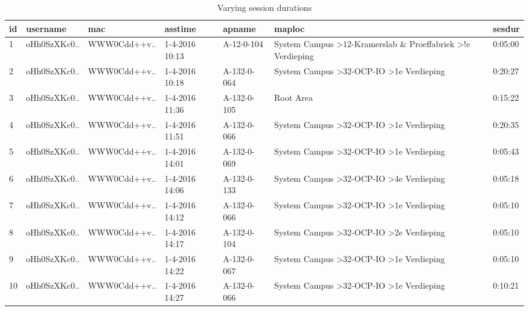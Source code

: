 \begin{table}[]
	\centering
	\captionsetup{justification=centering}
	\caption{Varying session durations}
	\label{sesdur_example}
	\begin{tabular}{@{}lllllll@{}}
		\toprule
		\textbf{id} & \textbf{username} & \textbf{mac} & \textbf{asstime} & \textbf{apname} & \textbf{maploc}                                                                     & \textbf{sesdur} \\ \midrule
		1           & oHh0SzXKc0..      & WWW0Cdd++v.. & 1-4-2016 10:13   & A-12-0-104      & System Campus \textgreater 12-Kramerslab \& Proeffabriek \textgreater !e Verdieping & 0:05:00         \\
		2           & oHh0SzXKc0..      & WWW0Cdd++v.. & 1-4-2016 10:18   & A-132-0-064     & System Campus \textgreater 32-OCP-IO \textgreater 1e Verdieping                     & 0:20:27         \\
		3           & oHh0SzXKc0..      & WWW0Cdd++v.. & 1-4-2016 11:36   & A-132-0-105     & Root Area                                                                           & 0:15:22         \\
		4           & oHh0SzXKc0..      & WWW0Cdd++v.. & 1-4-2016 11:51   & A-132-0-066     & System Campus \textgreater 32-OCP-IO \textgreater 1e Verdieping                     & 0:20:35         \\
		5           & oHh0SzXKc0..      & WWW0Cdd++v.. & 1-4-2016 14:01   & A-132-0-069     & System Campus \textgreater 32-OCP-IO \textgreater 1e Verdieping                     & 0:05:43         \\
		6           & oHh0SzXKc0..      & WWW0Cdd++v.. & 1-4-2016 14:06   & A-132-0-133     & System Campus \textgreater 32-OCP-IO \textgreater 4e Verdieping                     & 0:05:18         \\
		7           & oHh0SzXKc0..      & WWW0Cdd++v.. & 1-4-2016 14:12   & A-132-0-066     & System Campus \textgreater 32-OCP-IO \textgreater 1e Verdieping                     & 0:05:10         \\
		8           & oHh0SzXKc0..      & WWW0Cdd++v.. & 1-4-2016 14:17   & A-132-0-104     & System Campus \textgreater 32-OCP-IO \textgreater 2e Verdieping                     & 0:05:10         \\
		9           & oHh0SzXKc0..      & WWW0Cdd++v.. & 1-4-2016 14:22   & A-132-0-067     & System Campus \textgreater 32-OCP-IO \textgreater 1e Verdieping                     & 0:05:10         \\
		10          & oHh0SzXKc0..      & WWW0Cdd++v.. & 1-4-2016 14:27   & A-132-0-066     & System Campus \textgreater 32-OCP-IO \textgreater 1e Verdieping                     & 0:10:21         \\ \bottomrule
	\end{tabular}
\end{table}
